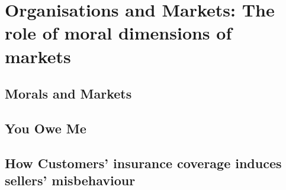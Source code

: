 
\chapter{Organisations and Markets: The role of moral dimensions of markets}

\section{Morals and Markets}
\section{You Owe Me}
\section{How Customers' insurance coverage induces sellers' misbehaviour}

